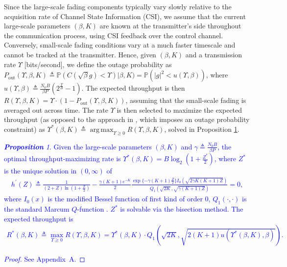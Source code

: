 \documentclass[12pt, draftcls, onecolumn]{IEEEtran}
\theoremstyle{plain}
\theoremstyle{definition}
\theoremstyle{remark}
\newtheorem{prop}{\textbf{Proposition}}
\DeclareMathOperator*{\argmax}{arg\,max}
\newcommand\hlt[1]{\textcolor{blue}{#1}}
\begin{document}
Since the large-scale fading components typically vary slowly relative to the acquisition rate of Channel State Information (CSI), we assume that the current large-scale parameters $(\beta,K)$ are known at the transmitter's side throughout the communication process, using CSI feedback over the control channel. Conversely, small-scale fading conditions vary at a much faster timescale and cannot be tracked at the transmitter. 
Hence, given $(\beta,K)$ and a transmission rate $\Upsilon$ [bits/second], we define the outage probability as $P_{\mathrm{out}}(\Upsilon,\beta,K){\triangleq}\mathbb{P}(C(\sqrt{\beta}g){<}\Upsilon)|\beta,K){=}\mathbb{P}\left(|g|^{2}{<}u(\Upsilon,\beta)\right)$, where $u(\Upsilon,\beta){\triangleq}\frac{N_{0}B}{\beta P}(2^{\frac{\Upsilon}{B}}{-}1)$. The expected throughput is then $R(\Upsilon,\beta,K){=}\Upsilon{\cdot}\left(1{-}P_{\mathrm{out}}(\Upsilon,\beta,K)\right)$, assuming that the small-scale fading is averaged out across time. The rate $\Upsilon$ is then selected to maximize the expected throughput (as opposed to the approach in \cite{Rician}, which imposes an outage probability constraint) as $\Upsilon^{*}(\beta,K){\triangleq}\argmax_{\Upsilon{\geq}0}R(\Upsilon,\beta,K)$, solved in Proposition \ref{P1}.
\hlt{\begin{prop}\label{P1}
    Given the large-scale parameters $(\beta,K)$ and $\gamma{\triangleq}\frac{N_{0}B}{\beta P}$, the optimal throughput-maximizing rate is $\Upsilon^{*}(\beta,K){=}B\log_{2}\left(1{+}\frac{Z^*}{2}\right)$, where $Z^*$ is the unique solution in $(0,\infty)$ of
    \begin{align}\label{hprime}
        h^\prime(Z) \triangleq \frac{1}{(2{+}Z)\ln\left(1{+}\frac{Z}{2}\right)} - \frac{\gamma(K{+}1)e^{-K}}{2}\frac{\exp\{-\gamma(K+1)\frac{Z}{2}\}I_{0}(\sqrt{2\gamma K(K{+}1)Z})}{Q_{1}(\sqrt{2K},\sqrt{\gamma(K{+}1)Z})} = 0,
    \end{align}
    where $I_{0}(x)$ is the modified Bessel function of first kind of order $0$, $Q_{1}(\cdot,\cdot)$ is the standard Marcum $Q$-function \cite{Rician}. $Z^*$ is solvable via the bisection method. The expected throughput is
    \begin{align}
    	R^*(\beta,K) \triangleq \max_{\Upsilon \geq 0} R(\Upsilon, \beta, K) = \Upsilon^{*}(\beta, K) \cdot Q_{1} (\sqrt{2K}, \sqrt{2(K + 1) u(\Upsilon^{*}(\beta, K),\beta)}).
    \end{align}
\end{prop}
\begin{proof}
    See Appendix~A.
\end{proof}}
\end{document}

